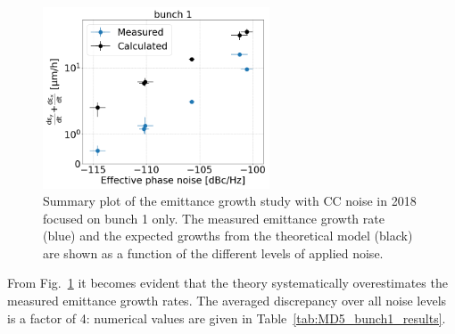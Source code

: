 \begin{figure}[!h]
   \centering         
   \includegraphics[width=0.6\textwidth]{images/Ch5/MD5_summary_bunch1_backg_subtracted_vs_theory.png}
       \caption{Summary plot of the emittance growth study with CC noise in 2018 focused on bunch 1 only. The measured emittance growth rate (blue) and the expected growths from the theoretical model (black) are shown as a function of the different levels of applied noise.}
       \label{fig:MD5_bunch1_theory_vs_meas}
\end{figure}


From Fig.~\ref{fig:MD5_bunch1_theory_vs_meas} it becomes evident that the theory systematically overestimates the measured emittance growth rates. The averaged discrepancy over all noise levels is a factor of 4: numerical values are given in Table~\ref{tab:MD5_bunch1_results}. %


